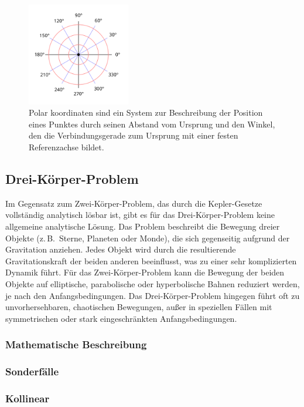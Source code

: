 \documentclass[a4paper,12pt,twoside]{article}
\begin{document}
\begin{figure}[H]
	\centering
	\includegraphics[width=0.4\textwidth]{Polarkoordinaten.svg.png}
	\caption[Eintrag in Abbildungsverzeichnis von Polarkoordinatsystem]{Polar koordinaten sind ein System zur Beschreibung der Position eines Punktes durch seinen Abstand vom Ursprung und den Winkel, den die Verbindungsgerade zum Ursprung mit einer festen Referenzachse bildet.}
	\label{polarkoordinatsystem.}
\end{figure}

\subsection{Drei-Körper-Problem}
Im Gegensatz zum Zwei-Körper-Problem, das durch die Kepler-Gesetze vollständig analytisch lösbar ist, gibt es für das Drei-Körper-Problem keine allgemeine analytische Lösung. Das Problem beschreibt die Bewegung dreier Objekte (z.\,B.\ Sterne, Planeten oder Monde), die sich gegenseitig aufgrund der Gravitation anziehen. Jedes Objekt wird durch die resultierende Gravitationskraft der beiden anderen beeinflusst, was zu einer sehr komplizierten Dynamik führt.
Für das Zwei-Körper-Problem kann die Bewegung der beiden Objekte auf elliptische, parabolische oder hyperbolische Bahnen reduziert werden, je nach den Anfangsbedingungen. Das Drei-Körper-Problem hingegen führt oft zu unvorhersehbaren, chaotischen Bewegungen, außer in speziellen Fällen mit symmetrischen oder stark eingeschränkten Anfangsbedingungen.
\subsubsection{Mathematische Beschreibung}
\subsubsection{Sonderfälle}
\subsubsection{Kollinear}
\end{document}
